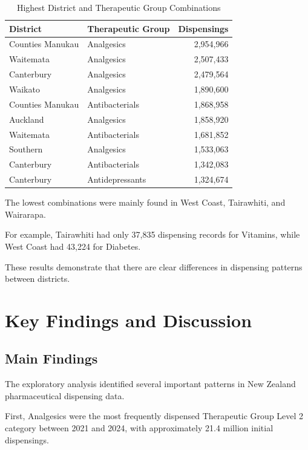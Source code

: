 \documentclass[11pt,a4paper]{report}
\begin{document}
\begin{table}[H]
\centering
\caption{Highest District and Therapeutic Group Combinations}
\label{tab:combinations}
\begin{tabular}{llr}
\toprule
\textbf{District} & \textbf{Therapeutic Group} & \textbf{Dispensings} \\
\midrule
Counties Manukau & Analgesics & 2,954,966 \\
Waitemata & Analgesics & 2,507,433 \\
Canterbury & Analgesics & 2,479,564 \\
Waikato & Analgesics & 1,890,600 \\
Counties Manukau & Antibacterials & 1,868,958 \\
Auckland & Analgesics & 1,858,920 \\
Waitemata & Antibacterials & 1,681,852 \\
Southern & Analgesics & 1,533,063 \\
Canterbury & Antibacterials & 1,342,083 \\
Canterbury & Antidepressants & 1,324,674 \\
\bottomrule
\end{tabular}
\end{table}

The lowest combinations were mainly found in West Coast, Tairawhiti, and Wairarapa.

For example, Tairawhiti had only 37,835 dispensing records for Vitamins, while West Coast had 43,224 for Diabetes.

These results demonstrate that there are clear differences in dispensing patterns between districts.



\chapter{Key Findings and Discussion}

\section{Main Findings}

The exploratory analysis identified several important patterns in New Zealand pharmaceutical dispensing data.

First, Analgesics were the most frequently dispensed Therapeutic Group Level 2 category between 2021 and 2024, with approximately 21.4 million initial dispensings.
\end{document}
